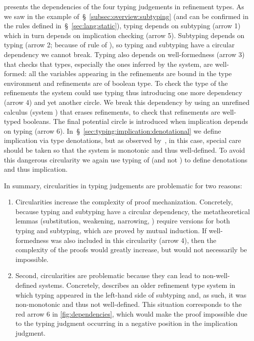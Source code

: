 %
 presents the dependencies of the four typing judgements in refinement types.
As we saw in the example of~\S~\ref{subsec:overview:subtyping} 
(and can be confirmed in the rules defined in~\S~\ref{sec:lang:static}),
typing depends on subtyping (arrow 1) which in turn depends on implication checking (arrow 5).
Subtyping depends on typing (arrow 2; because of rule \sWitn of ),
so typing and subtyping have a circular dependency we cannot break.
%
Typing also depends on well-formedness (arrow 3) that checks that
types, especially the ones inferred by the system, are well-formed:
all the variables appearing in the refinements are bound in the type environment
and refinements are of boolean type.
To check the type of the refinements the system could use typing
thus introducing one more dependency (arrow 4) and yet another circle.
We break this dependency by using an unrefined calculus (system \sysf)
that erases refinements, to check that refinements are well-typed booleans.
%
The final potential circle is introduced when implication depends on typing (arrow 6).
In~\S~\ref{sec:typing:implication:denotational} we define implication via type denotations,
but as observed by~\citet{Greenberg13}, in this case, special care should be taken
so that the system is monotonic and thus well-defined.
To avoid this dangerous circularity we again use typing of \sysf (and not \sysrf) to define
denotations and thus implication.

In summary, circularities in typing judgements are problematic for two reasons:
\begin{enumerate}[leftmargin=*]
\item Circularities increase the complexity of proof mechanization. 
Concretely, because typing and subtyping have a circular dependency, 
the metatheoretical lemmas (substitution, weakening, narrowing, \etc) 
require versions for both typing and subtyping, which are proved by mutual induction. 
If well-formedness was also included in this circularity (arrow 4),
 then the complexity of the proofs would greatly increase, 
 but would not necessarily be impossible.
\item Second, circularities are problematic because they can lead to non-well-defined systems. 
Concretely, \citet{Greenberg13} describes an older refinement type system 
in which typing appeared in the left-hand side of subtyping and, as such, 
it was non-monotonic and thus not well-defined. 
This situation corresponds to the red arrow 6 in \cref{fig:dependencies}, 
which would make the proof impossible due to the typing judgment occurring in 
a negative position in the implication judgment.  
\end{enumerate}


